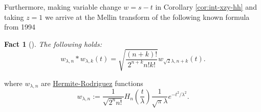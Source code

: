 \documentclass[pdf,notes]{beamer}
\newtheorem*{fact*}{Fact}
\begin{document}
\begin{frame}
	Furthermore, making variable change $w=s-t$ in Corollary \ref{cor:int-xzy-hh} and taking $z=1$ we arrive at
	the Mellin transform of the following known formula from 1994
	\begin{fact*}[{\cite[(18)]{conte1994hermite}}]
		The following holds:
		\begin{equation}
			w_{\lambda,n}\ast w_{\lambda,k}(t)=\sqrt{\frac{(n+k)!}{2^{n+k}n!k!}}w_{\sqrt{2}\lambda,n+k}(t).
			\label{eqn:mellin-hh}
		\end{equation}
	\end{fact*}
	where $w_{\lambda,n}$ are \underline{Hermite-Rodriguez} functions \cite{yusoff2007application}
	\begin{equation*}
		w_{\lambda,n}:=\frac{1}{\sqrt{2^nn!}}H_n\left( \frac{t}{\lambda} \right)\frac{1}{\sqrt{\pi}\lambda}e^{-t^2/\lambda^2}.
	\end{equation*}
\end{frame}
\end{document}
